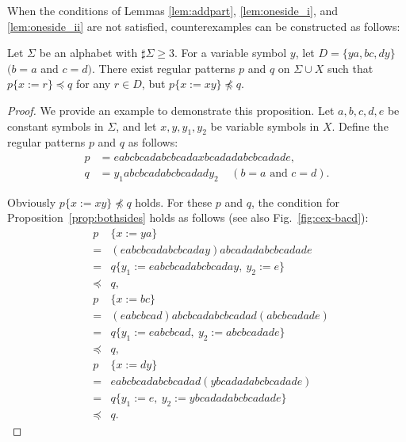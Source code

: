 When the conditions of Lemmas \ref{lem:addpart}, \ref{lem:oneside_i}, and \ref{lem:oneside_ii} are not satisfied, counterexamples can be constructed as follows:

\begin{prop}\label{prop:bothsides}
  Let $\Sigma$ be an alphabet with $\sharp \Sigma \ge 3$.
  For a variable symbol $y$, let $D= \{ ya, bc, dy \}$ $(b = a$ and $c = d)$.
  There exist regular patterns $p$ and $q$ on $\Sigma\cup X$ such that $p \{ x := r \} \preceq q$ for any $r \in D$, but $p \{ x := xy \} \not \preceq q$.
\end{prop}

\begin{proof}
We provide an example to demonstrate this proposition.
Let $a,b,c,d,e$ be constant symbols in $\Sigma$, and let 
$x,y,y_{1},y_{2}$ be variable symbols in $X$.
Define the regular patterns $p$ and $q$ as follows:
\begin{align*}
p &= eabcbcadabcbcadaxbcadadabcbcadade,\\
q &= y_{1}abcbcadabcbcadady_{2}~~~~~(b = a\mbox{~and~}c = d).
\end{align*}

\noindent
Obviously $p \{ x:=xy \} \not \preceq q$ holds.
For these $p$ and $q$, the condition for Proposition~\ref{prop:bothsides} holds as follows (see also Fig.~\ref{fig:cex-bacd}):
\begin{eqnarray*}
&p& \{ x:=ya \} \\ 
& = & (eabcbcadabcbcaday)abcadadabcbcadade\\
& = & q \{ y_{1} := eabcbcadabcbcaday,~y_{2}:=e \} \\
& \preceq & q,\\
&p& \{ x:=bc \}  \\
& = & (eabcbcad)abcbcadabcbcadad(abcbcadade) \\
& = & q \{ y_{1} := eabcbcad,~y_{2} := abcbcadade \} \\
& \preceq & q,\\
&p& \{ x:=dy \}  \\
& = & eabcbcadabcbcadad(ybcadadabcbcadade) \\
& = & q \{ y_{1}:=e,~y_{2} := ybcadadabcbcadade \} \\
& \preceq & q.
\end{eqnarray*}
\end{proof}

